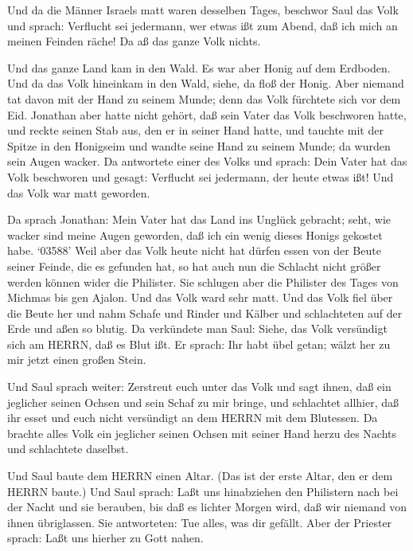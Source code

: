  Und da die Männer Israels matt waren desselben Tages,
beschwor Saul das Volk und sprach: Verflucht sei jedermann, wer etwas
ißt zum Abend, daß ich mich an meinen Feinden räche! Da aß das ganze
Volk nichts.

 Und das ganze Land kam in den Wald. Es war aber Honig auf
dem Erdboden.  Und da das Volk hineinkam in den Wald,
siehe, da floß der Honig. Aber niemand tat davon mit der Hand zu seinem
Munde; denn das Volk fürchtete sich vor dem Eid.  Jonathan
aber hatte nicht gehört, daß sein Vater das Volk beschworen hatte, und
reckte seinen Stab aus, den er in seiner Hand hatte, und tauchte mit der
Spitze in den Honigseim und wandte seine Hand zu seinem Munde; da wurden
sein Augen wacker.  Da antwortete einer des Volks und
sprach: Dein Vater hat das Volk beschworen und gesagt: Verflucht sei
jedermann, der heute etwas ißt! Und das Volk war matt geworden.

 Da sprach Jonathan: Mein Vater hat das Land ins Unglück
gebracht; seht, wie wacker sind meine Augen geworden, daß ich ein wenig
dieses Honigs gekostet habe.  `03588' Weil aber das Volk
heute nicht hat dürfen essen von der Beute seiner Feinde, die es
gefunden hat, so hat auch nun die Schlacht nicht größer werden können
wider die Philister.  Sie schlugen aber die Philister des
Tages von Michmas bis gen Ajalon. Und das Volk ward sehr matt.
 Und das Volk fiel über die Beute her und nahm Schafe und
Rinder und Kälber und schlachteten auf der Erde und aßen so blutig.
 Da verkündete man Saul: Siehe, das Volk versündigt sich am
HERRN, daß es Blut ißt. Er sprach: Ihr habt übel getan; wälzt her zu mir
jetzt einen großen Stein.

 Und Saul sprach weiter: Zerstreut euch unter das Volk und
sagt ihnen, daß ein jeglicher seinen Ochsen und sein Schaf zu mir
bringe, und schlachtet allhier, daß ihr esset und euch nicht versündigt
an dem HERRN mit dem Blutessen. Da brachte alles Volk ein jeglicher
seinen Ochsen mit seiner Hand herzu des Nachts und schlachtete daselbst.

 Und Saul baute dem HERRN einen Altar. (Das ist der erste
Altar, den er dem HERRN baute.)  Und Saul sprach: Laßt uns
hinabziehen den Philistern nach bei der Nacht und sie berauben, bis daß
es lichter Morgen wird, daß wir niemand von ihnen übriglassen. Sie
antworteten: Tue alles, was dir gefällt. Aber der Priester sprach: Laßt
uns hierher zu Gott nahen.

